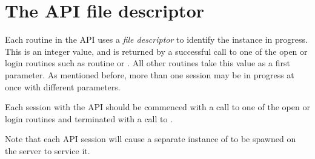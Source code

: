 \chapter{The API file descriptor}
\label{chp:the-api-file-descriptor}
Each routine in the API uses a \textit{file descriptor} to identify the
instance in progress. This is an integer value, and is returned by a
successful call to one of the open or login routines such as \funcXBopen{} routine or \funcXBlogin{}.
All other routines take this value as a first parameter. As mentioned before, more than one
session may be in progress at once with different parameters.

Each session with the API should be commenced with a call to one of the open or login routines and terminated with a call to \funcXBclose{}.

Note that each API session will cause a separate instance of  to be spawned on the server to service it.


